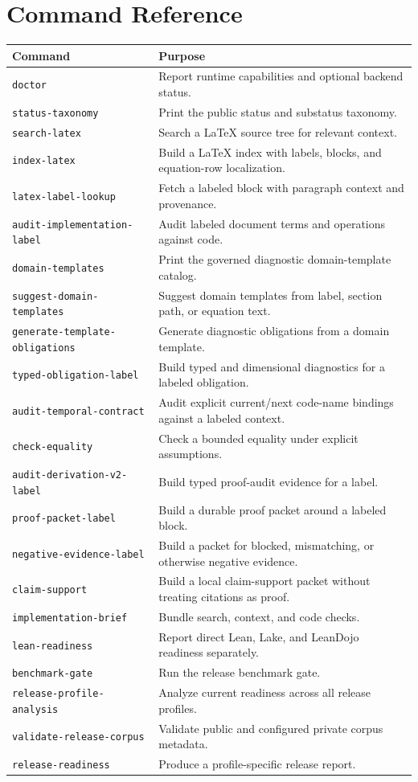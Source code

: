 \documentclass[12pt,a4paper,openany]{book}
\begin{document}
\chapter{Command Reference}

\begin{longtable}{p{}p{}}
\toprule
Command & Purpose \\
\midrule
\texttt{doctor} & Report runtime capabilities and optional backend status. \\
\texttt{status-taxonomy} & Print the public status and substatus taxonomy. \\
\texttt{search-latex} & Search a LaTeX source tree for relevant context. \\
\texttt{index-latex} & Build a LaTeX index with labels, blocks, and equation-row localization. \\
\texttt{latex-label-lookup} & Fetch a labeled block with paragraph context and provenance. \\
\texttt{audit-implementation-label} & Audit labeled document terms and operations against code. \\
\texttt{domain-templates} & Print the governed diagnostic domain-template catalog. \\
\texttt{suggest-domain-templates} & Suggest domain templates from label, section path, or equation text. \\
\texttt{generate-template-obligations} & Generate diagnostic obligations from a domain template. \\
\texttt{typed-obligation-label} & Build typed and dimensional diagnostics for a labeled obligation. \\
\texttt{audit-temporal-contract} & Audit explicit current/next code-name bindings against a labeled context. \\
\texttt{check-equality} & Check a bounded equality under explicit assumptions. \\
\texttt{audit-derivation-v2-label} & Build typed proof-audit evidence for a label. \\
\texttt{proof-packet-label} & Build a durable proof packet around a labeled block. \\
\texttt{negative-evidence-label} & Build a packet for blocked, mismatching, or otherwise negative evidence. \\
\texttt{claim-support} & Build a local claim-support packet without treating citations as proof. \\
\texttt{implementation-brief} & Bundle search, context, and code checks. \\
\texttt{lean-readiness} & Report direct Lean, Lake, and LeanDojo readiness separately. \\
\texttt{benchmark-gate} & Run the release benchmark gate. \\
\texttt{release-profile-analysis} & Analyze current readiness across all release profiles. \\
\texttt{validate-release-corpus} & Validate public and configured private corpus metadata. \\
\texttt{release-readiness} & Produce a profile-specific release report. \\
\bottomrule
\end{longtable}
\end{document}
